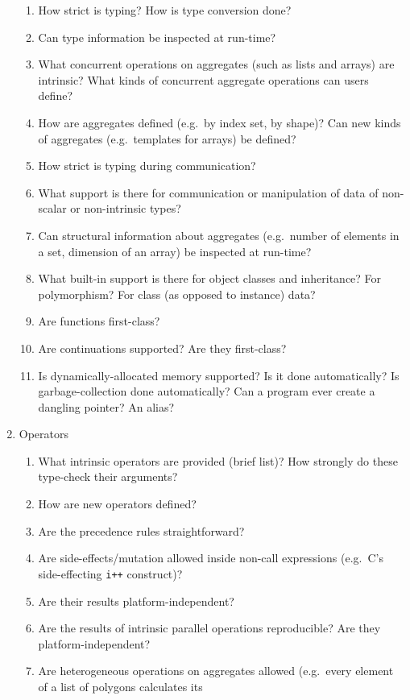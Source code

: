 \begin{enumerate}
\begin{enumerate}
  \item How strict is typing?
	How is type conversion done?
  \item Can type information be inspected at run-time?
  \item What concurrent operations on aggregates
	(such as lists and arrays) are intrinsic?
	What kinds of concurrent aggregate operations can users define?
  \item How are aggregates defined (e.g.\ by index set, by shape)?
	Can new kinds of aggregates (e.g.\ templates for arrays)
	be defined?
  \item How strict is typing during communication?
  \item What support is there for communication or manipulation
	of data of non-scalar or non-intrinsic types?
  \item Can structural information about aggregates
	(e.g.\ number of elements in a set, dimension of an array)
	be inspected at run-time?
  \item What built-in support is there for object classes and inheritance?
	For polymorphism?
	For class (as opposed to instance) data?
  \item Are functions first-class?
  \item Are continuations supported?  Are they first-class?
  \item Is dynamically-allocated memory supported?
	Is it done automatically?
	Is garbage-collection done automatically?
	Can a program ever create a dangling pointer?
	An alias?
  \end{enumerate}
\item Operators
  \begin{enumerate}
  \item What intrinsic operators are provided (brief list)?
	How strongly do these type-check their arguments?
  \item How are new operators defined?
  \item Are the precedence rules straightforward?
  \item Are side-effects/mutation allowed inside non-call expressions
	(e.g.\ C's side-effecting \verb`i++` construct)?
  \item Are their results platform-independent?
  \item Are the results of intrinsic parallel operations reproducible?
	Are they platform-independent?
  \item Are heterogeneous operations on aggregates allowed
	(e.g.\ every element of a list of polygons calculates its

\end{enumerate}
\end{enumerate}
